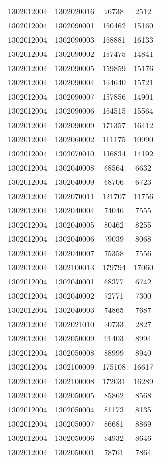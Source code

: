 \begin{longtable}{llcc}
1302012004 & 1302020016 & 26738 & 2512\\
1302012004 & 1302090001 & 160462 & 15160\\
1302012004 & 1302090003 & 168881 & 16133\\
1302012004 & 1302090002 & 157475 & 14841\\
1302012004 & 1302090005 & 159859 & 15176\\
1302012004 & 1302090004 & 164640 & 15721\\
1302012004 & 1302090007 & 157856 & 14901\\
1302012004 & 1302090006 & 164515 & 15564\\
1302012004 & 1302090009 & 171357 & 16412\\
1302012004 & 1302060002 & 111175 & 10990\\
1302012004 & 1302070010 & 136834 & 14192\\
1302012004 & 1302040008 & 68564 & 6632\\
1302012004 & 1302040009 & 68706 & 6723\\
1302012004 & 1302070011 & 121707 & 11756\\
1302012004 & 1302040004 & 74046 & 7555\\
1302012004 & 1302040005 & 80462 & 8255\\
1302012004 & 1302040006 & 79039 & 8068\\
1302012004 & 1302040007 & 75358 & 7556\\
1302012004 & 1302100013 & 179794 & 17060\\
1302012004 & 1302040001 & 68377 & 6742\\
1302012004 & 1302040002 & 72771 & 7300\\
1302012004 & 1302040003 & 74865 & 7687\\
1302012004 & 1302021010 & 30733 & 2827\\
1302012004 & 1302050009 & 91403 & 8994\\
1302012004 & 1302050008 & 88999 & 8940\\
1302012004 & 1302100009 & 175108 & 16617\\
1302012004 & 1302100008 & 172031 & 16289\\
1302012004 & 1302050005 & 85862 & 8568\\
1302012004 & 1302050004 & 81173 & 8135\\
1302012004 & 1302050007 & 86681 & 8869\\
1302012004 & 1302050006 & 84932 & 8646\\
1302012004 & 1302050001 & 78761 & 7864\\

\end{longtable}
